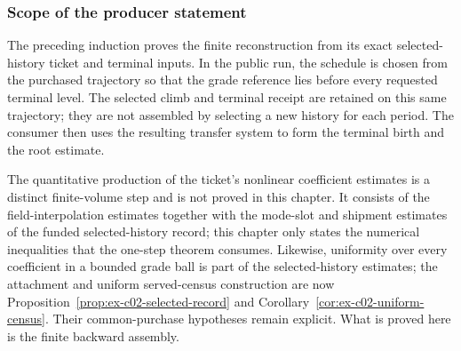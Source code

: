 \subsubsection{Scope of the producer statement}

The preceding induction proves the finite reconstruction from its exact selected-history ticket and terminal inputs. In the public run, the schedule is chosen from the purchased trajectory so that the grade reference lies before every requested terminal level. The selected climb and terminal receipt are retained on this same trajectory; they are not assembled by selecting a new history for each period. The consumer then uses the resulting transfer system to form the terminal birth and the root estimate.

The quantitative production of the ticket's nonlinear coefficient estimates is a distinct finite-volume step and is not proved in this chapter. It consists of the field-interpolation estimates together with the mode-slot and shipment estimates of the funded selected-history record; this chapter only states the numerical inequalities that the one-step theorem consumes. Likewise, uniformity over every coefficient in a bounded grade ball is part of the selected-history estimates; the attachment and uniform served-census construction are now
Proposition~\ref{prop:ex-c02-selected-record} and
Corollary~\ref{cor:ex-c02-uniform-census}. Their common-purchase
hypotheses remain explicit. What is proved here is the finite backward assembly.
